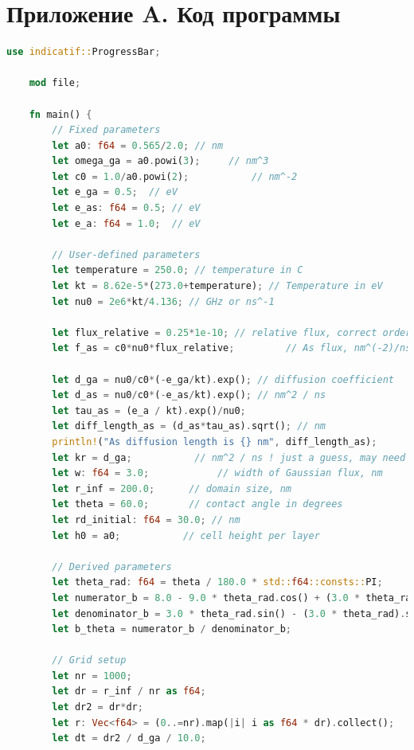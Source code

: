 \documentclass[14pt,oneside]{extarticle}
\begin{document}
\clearpage
{}
\printbibliography


\clearpage
\appendix

\section*{Приложение A. Код программы}

\begin{lstlisting}[language=Rust]
    use indicatif::ProgressBar;

    mod file;
    
    fn main() {
        // Fixed parameters
        let a0: f64 = 0.565/2.0; // nm
        let omega_ga = a0.powi(3);     // nm^3
        let c0 = 1.0/a0.powi(2);           // nm^-2
        let e_ga = 0.5;  // eV
        let e_as: f64 = 0.5; // eV
        let e_a: f64 = 1.0;  // eV
    
        // User-defined parameters
        let temperature = 250.0; // temperature in C
        let kt = 8.62e-5*(273.0+temperature); // Temperature in eV
        let nu0 = 2e6*kt/4.136; // GHz or ns^-1
    
        let flux_relative = 0.25*1e-10; // relative flux, correct order, do not change the order
        let f_as = c0*nu0*flux_relative;         // As flux, nm^(-2)/ns
    
        let d_ga = nu0/c0*(-e_ga/kt).exp(); // diffusion coefficient
        let d_as = nu0/c0*(-e_as/kt).exp(); // nm^2 / ns
        let tau_as = (e_a / kt).exp()/nu0;
        let diff_length_as = (d_as*tau_as).sqrt(); // nm
        println!("As diffusion length is {} nm", diff_length_as);
        let kr = d_ga;           // nm^2 / ns ! just a guess, may need to change
        let w: f64 = 3.0;            // width of Gaussian flux, nm
        let r_inf = 200.0;      // domain size, nm
        let theta = 60.0;       // contact angle in degrees
        let rd_initial: f64 = 30.0; // nm
        let h0 = a0;           // cell height per layer
    
        // Derived parameters
        let theta_rad: f64 = theta / 180.0 * std::f64::consts::PI;
        let numerator_b = 8.0 - 9.0 * theta_rad.cos() + (3.0 * theta_rad).cos();
        let denominator_b = 3.0 * theta_rad.sin() - (3.0 * theta_rad).sin();
        let b_theta = numerator_b / denominator_b;
    
        // Grid setup
        let nr = 1000;
        let dr = r_inf / nr as f64;
        let dr2 = dr*dr;
        let r: Vec<f64> = (0..=nr).map(|i| i as f64 * dr).collect();
        let dt = dr2 / d_ga / 10.0;
    

\end{lstlisting}
\end{document}
